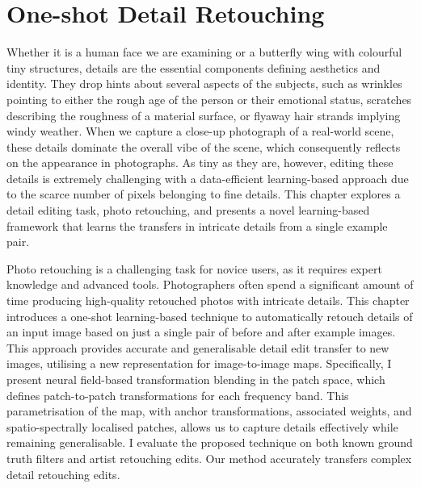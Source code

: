 \chapter{One-shot Detail Retouching}\label{one-shot}

Whether it is a human face we are examining or a butterfly wing with colourful tiny structures, details are the essential components defining aesthetics and identity. They drop hints about several aspects of the subjects, such as wrinkles pointing to either the rough age of the person or their emotional status, scratches describing the roughness of a material surface, or flyaway hair strands implying windy weather. When we capture a close-up photograph of a real-world scene, these details dominate the overall vibe of the scene, which consequently reflects on the appearance in photographs. As tiny as they are, however, editing these details is extremely challenging with a data-efficient learning-based approach due to the scarce number of pixels belonging to fine details. This chapter explores a detail editing task, photo retouching, and presents a novel learning-based framework that learns the transfers in intricate details from a single example pair.

Photo retouching is a challenging task for novice users, as it requires expert knowledge and advanced tools. Photographers often spend a significant amount of time producing high-quality retouched photos with intricate details. This chapter introduces a one-shot learning-based technique to automatically retouch details of an input image based on just a single pair of before and after example images. This approach provides accurate and generalisable detail edit transfer to new images, utilising a new representation for image-to-image maps. Specifically, I present neural field-based transformation blending in the patch space, which defines patch-to-patch transformations for each frequency band. This parametrisation of the map, with anchor transformations, associated weights, and spatio-spectrally localised patches, allows us to capture details effectively while remaining generalisable. I evaluate the proposed technique on both known ground truth filters and artist retouching edits. Our method accurately transfers complex detail retouching edits.

